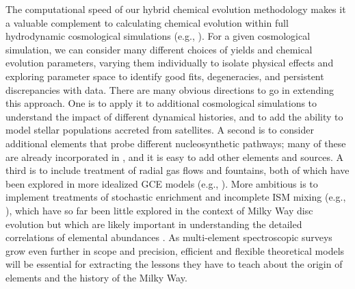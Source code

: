 The computational speed of our hybrid chemical evolution methodology makes it
a valuable complement to calculating chemical evolution within full 
hydrodynamic cosmological simulations 
(e.g., \citealt{Mackereth2017,Grand2018,Naiman2018,Buck2020,Vincenzo2020}).
For a given cosmological simulation, we can consider many different choices
of yields and chemical evolution parameters, varying them individually to
isolate physical effects and exploring parameter space to identify good
fits, degeneracies, and persistent discrepancies with data.  There are 
many obvious directions to go in extending this approach.  One is to apply
it to additional cosmological simulations to understand the impact of 
different dynamical histories, and to add the ability to model stellar
populations accreted from satellites.  A second is to consider additional
elements that probe different nucleosynthetic pathways; many of these are
already incorporated in \vice, and it is easy to add other elements and sources.
A third is to include treatment of radial gas flows and fountains, both
of which have been explored in more idealized GCE models
(e.g., \citealt{Lacey1985,Bilitewski2012,Kubryk2015a,Kubryk2015b,
Spitoni2013,Pezzuli2016,Sharda2021}).  More ambitious is to implement
treatments of stochastic enrichment and incomplete ISM mixing
(e.g., \citealt{Montes2016,Krumholz2018b,Beniamini2020}), which have so 
far been little explored in the context of Milky Way disc evolution
but which are likely important in understanding the detailed correlations
of elemental abundances \citep{Ting2021}.  As multi-element spectroscopic
surveys grow even further in scope and precision, efficient and flexible
theoretical models will be essential for extracting the lessons they
have to teach about the origin of elements and the history of the Milky Way.
